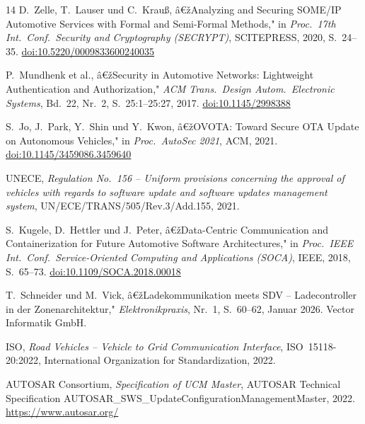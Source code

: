 ﻿\documentclass[12pt,a4paper,twoside]{article}
\begin{document}
\begin{thebibliography}{14}
D.~Zelle, T.~Lauser und C.~Krau{\ss}, â€žAnalyzing and Securing SOME/IP
Automotive Services with Formal and Semi-Formal Methods," in
\textit{Proc.\ 17th Int.\ Conf.\ Security and Cryptography (SECRYPT)},
SCITEPRESS, 2020, S.~24--35.
\href{https://doi.org/10.5220/0009833600240035}{doi:10.5220/0009833600240035}

P.~Mundhenk et al., â€žSecurity in Automotive Networks: Lightweight
Authentication and Authorization," \textit{ACM Trans.\ Design Autom.\
Electronic Systems}, Bd.~22, Nr.~2, S.~25:1--25:27, 2017.
\href{https://doi.org/10.1145/2998388}{doi:10.1145/2998388}

S.~Jo, J.~Park, Y.~Shin und Y.~Kwon, â€žOVOTA: Toward Secure OTA Update
on Autonomous Vehicles," in \textit{Proc.\ AutoSec 2021},
ACM, 2021.
\href{https://doi.org/10.1145/3459086.3459640}{doi:10.1145/3459086.3459640}

UNECE, \textit{Regulation No.~156 -- Uniform provisions concerning the
approval of vehicles with regards to software update and software updates
management system}, UN/ECE/TRANS/505/Rev.3/Add.155, 2021.

S.~Kugele, D.~Hettler und J.~Peter, â€žData-Centric Communication and
Containerization for Future Automotive Software Architectures," in
\textit{Proc.\ IEEE Int.\ Conf.\ Service-Oriented Computing and Applications
(SOCA)}, IEEE, 2018, S.~65--73.
\href{https://doi.org/10.1109/SOCA.2018.00018}{doi:10.1109/SOCA.2018.00018}

T.~Schneider und M.~Vick, â€žLadekommunikation meets SDV -- Ladecontroller in
der Zonenarchitektur," \textit{Elektronikpraxis}, Nr.~1, S.~60--62, Januar 2026.
Vector Informatik GmbH.

ISO, \textit{Road Vehicles -- Vehicle to Grid Communication Interface},
ISO~15118-20:2022, International Organization for Standardization, 2022.

AUTOSAR Consortium, \textit{Specification of UCM Master},
AUTOSAR Technical Specification
AUTOSAR\_SWS\_UpdateConfigurationManagementMaster, 2022.
\url{https://www.autosar.org/}

\end{thebibliography}



\printglossary[type=\acronymtype,title=Abkürzungsverzeichnis]
\end{document}
